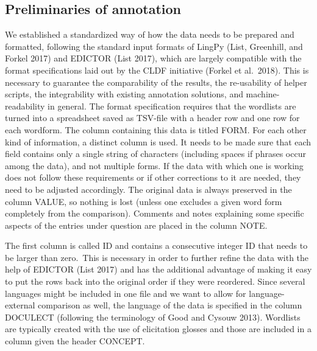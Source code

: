 \documentclass[
  english,
  a4paper,
  oneside,tablecaptionabove
]{scrbook}
\begin{document}
\hypertarget{preliminaries-of-annotation}{%
\subsection{\texorpdfstring{{Preliminaries of
annotation}}{Preliminaries of annotation}}\label{preliminaries-of-annotation}}

We established a standardized way of how the data needs to be prepared
and formatted, following the standard input formats of LingPy (List,
Greenhill, and Forkel 2017) and EDICTOR (List 2017), which are largely
compatible with the format specifications laid out by the CLDF
initiative (Forkel et al.~2018). This is necessary to guarantee the
comparability of the results, the re-usability of helper scripts, the
integrability with existing annotation solutions, and
machine-readability in general. The format specification requires that
the wordlists are turned into a spreadsheet saved as TSV-file with a
header row and one row for each wordform. The column containing this
data is titled FORM. For each other kind of information, a distinct
column is used. It needs to be made sure that each field contains only a
single string of characters (including spaces if phrases occur among the
data), and not multiple forms. If the data with which one is working
does not follow these requirements or if other corrections to it are
needed, they need to be adjusted accordingly. The original data is
always preserved in the column VALUE, so nothing is lost (unless one
excludes a given word form completely from the comparison). Comments and
notes explaining some specific aspects of the entries under question are
placed in the column NOTE.

The first column is called ID and contains a consecutive integer ID that
needs to be larger than zero.~This is necessary in order to further
refine the data with the help of EDICTOR (List 2017) and has the
additional advantage of making it easy to put the rows back into the
original order if they were reordered. Since several languages might be
included in one file and we want to allow for language-external
comparison as well, the language of the data is specified in the column
DOCULECT (following the terminology of Good and Cysouw 2013). Wordlists
are typically created with the use of elicitation glosses and those are
included in a column given the header CONCEPT.
\end{document}
